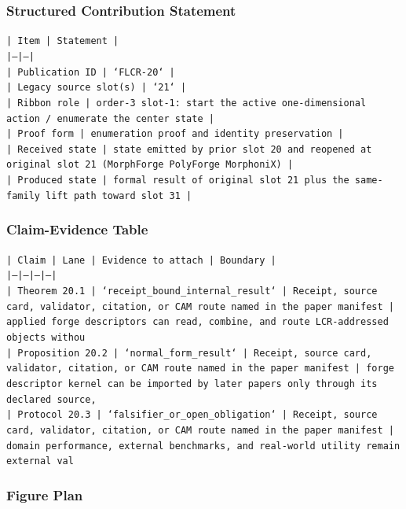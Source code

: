 \documentclass[11pt]{article}
\begin{document}
\subsubsection*{Structured Contribution Statement}

\noindent\texttt{| Item | Statement |}\\
\noindent\texttt{|---|---|}\\
\noindent\texttt{| Publication ID | `FLCR-20` |}\\
\noindent\texttt{| Legacy source slot(s) | `21` |}\\
\noindent\texttt{| Ribbon role | order-3 slot-1: start the active one-dimensional action / enumerate the center state |}\\
\noindent\texttt{| Proof form | enumeration proof and identity preservation |}\\
\noindent\texttt{| Received state | state emitted by prior slot 20 and reopened at original slot 21 (MorphForge PolyForge MorphoniX) |}\\
\noindent\texttt{| Produced state | formal result of original slot 21 plus the same-family lift path toward slot 31 |}\\

\subsubsection*{Claim-Evidence Table}

\noindent\texttt{| Claim | Lane | Evidence to attach | Boundary |}\\
\noindent\texttt{|---|---|---|---|}\\
\noindent\texttt{| Theorem 20.1 | `receipt\_bound\_internal\_result` | Receipt, source card, validator, citation, or CAM route named in the paper manifest | applied forge descriptors can read, combine, and route LCR-addressed objects withou}\\
\noindent\texttt{| Proposition 20.2 | `normal\_form\_result` | Receipt, source card, validator, citation, or CAM route named in the paper manifest | forge descriptor kernel can be imported by later papers only through its declared source, }\\
\noindent\texttt{| Protocol 20.3 | `falsifier\_or\_open\_obligation` | Receipt, source card, validator, citation, or CAM route named in the paper manifest | domain performance, external benchmarks, and real-world utility remain external val}\\

\subsubsection*{Figure Plan}
\end{document}

